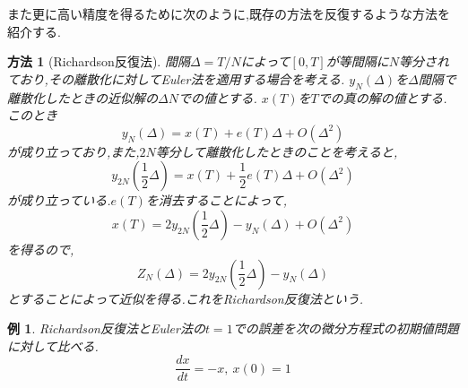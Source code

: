 \documentclass[a4paper,dvipdfmx]{jreport}
\numberwithin{equation}{section}
\newtheorem{Ex}      [Thm]{例}
\newtheorem{Method}[Thm]{方法}
\renewenvironment{leftbar}{%
  \def\FrameCommand{\vrule width 1pt \hspace{10pt}}%
  \MakeFramed {\advance\hsize-\width \FrameRestore}}%
 {\endMakeFramed}
\def\method{\begin{leftbar}\begin{Method}}
\def\methodx{\end{Method}\end{leftbar}}
\def\ex{\begin{Ex}}
\def\exx{\end{Ex}}
\def\eq{\begin{equation}}
\def\eqx{\end{equation}}
\begin{document}
また更に高い精度を得るために次のように,既存の方法を反復するような方法を紹介する.

\method[Richardson反復法]
間隔$\Delta = T/N$によって$[0,T]$が等間隔に$N$等分されており,その離散化に対してEuler法を適用する場合を考える.
$y_N(\Delta)$を$\Delta$間隔で離散化したときの近似解の$\Delta N$での値とする.
$x(T)$を$T$での真の解の値とする.このとき
\eq
y_N(\Delta) = x(T) + e(T) \Delta + O(\Delta^2)
\eqx
が成り立っており,また,$2N$等分して離散化したときのことを考えると,
\eq
y_{2N}(\frac{1}{2}\Delta) = x(T) + \frac{1}{2} e(T) \Delta + O(\Delta^2)
\eqx
が成り立っている.$e(T)$を消去することによって,
\eq
x(T) = 2y_{2N}(\frac{1}{2}\Delta) - y_N(\Delta) + O(\Delta^2)
\eqx
を得るので,
\eq
Z_N(\Delta) = 2y_{2N}(\frac{1}{2}\Delta) - y_N(\Delta)
\eqx
とすることによって近似を得る.これをRichardson反復法という.
\methodx
\ex
Richardson反復法とEuler法の$t=1$での誤差を次の微分方程式の初期値問題に対して比べる.
\[
\frac{dx}{dt} = -x , \ x(0) = 1
\]
\exx
{\par%
\vspace{-1\baselineskip}%
}%
\end{document}
